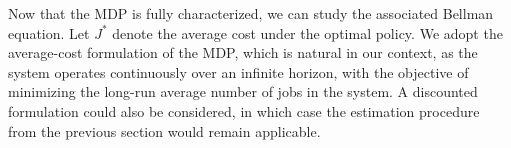 \documentclass[11pt]{article}
\theoremstyle{remark}
\theoremstyle{definition}
\numberwithin{equation}{section}
\begin{document}

{Now that the MDP is fully characterized, we can study the associated Bellman equation.} Let \( J^{*} \) denote the average cost under the optimal policy. We adopt the average-cost formulation of the MDP, which is natural in our context, as the system operates continuously over an infinite horizon, with the objective of minimizing the long-run average number of jobs in the system. A discounted formulation could also be considered, in which case the estimation procedure from the previous section would remain applicable.
\end{document}
